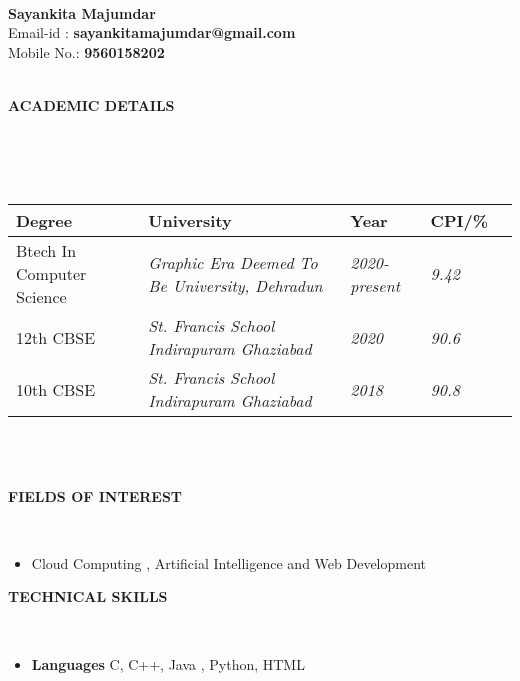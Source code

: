 \documentclass[a4paper,10pt]{article}
\newcommand{\lsep}{-0.5cm}
\newcommand{\resheading}[1]{{\small \colorbox{mygrey}{\begin{minipage}{0.975\textwidth}{\textbf{#1 \vphantom{p\^{E}}}}\end{minipage}}}}
\begin{document}
\hspace{0.5cm}\\[-0.2cm]

\textbf{Sayankita Majumdar} \\
\indent Email-id : \textbf{sayankitamajumdar@gmail.com} \\
\indent Mobile No.: \textbf{9560158202} \\
\\


\resheading{\textbf{ACADEMIC DETAILS} }\\[\lsep]
\\ \\
\indent \begin{tabular}{ l @{\hskip 0.15in} l @{\hskip 0.15in} l @{\hskip 0.15in} l @{\hskip 0.15in} l }
\hline
\textbf{Degree} & \textbf{University} &  \textbf{Year} & \textbf{CPI/\%} \\
\hline
 Btech In Computer Science & \textit{Graphic Era Deemed To Be University, Dehradun} & \textit{2020-present} & \textit{9.42}\\
 12th CBSE & \textit{St. Francis School Indirapuram Ghaziabad} & \textit{2020} & \textit{90.6}\\
 10th CBSE & \textit{St. Francis School Indirapuram Ghaziabad} & \textit{2018} & \textit{90.8}\\
 
\hline
\end{tabular}
\\ \\

\resheading{\textbf{FIELDS OF INTEREST} }\\[\lsep]
\begin{itemize}
\item \noindent Cloud Computing , Artificial Intelligence and Web Development
\end{itemize}

\resheading{\textbf{TECHNICAL SKILLS} }\\[\lsep]
\begin{itemize}
\item \noindent \textbf{Languages } C, C++, Java , Python, HTML
\end{itemize}
\end{document}
